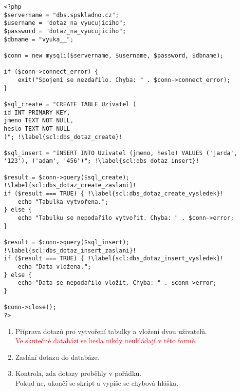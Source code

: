 \begin{minipage}[t]{.45\textwidth}
\begin{code}
\begin{verbatim}
<?php
$servername = "dbs.spskladno.cz"; 
$username = "dotaz_na_vyucujiciho";
$password = "dotaz_na_vyucujiciho";
$dbname = "vyuka__";

$conn = new mysqli($servername, $username, $password, $dbname); 

if ($conn->connect_error) { 
    exit("Spojení se nezdařilo. Chyba: " . $conn->connect_error);
}

$sql_create = "CREATE TABLE Uzivatel ( 
id INT PRIMARY KEY,
jmeno TEXT NOT NULL,
heslo TEXT NOT NULL
)"; !\label{scl:dbs_dotaz_create}!

$sql_insert = "INSERT INTO Uzivatel (jmeno, heslo) VALUES ('jarda', '123'), ('adam', '456')"; !\label{scl:dbs_dotaz_insert}!

$result = $conn->query($sql_create); !\label{scl:dbs_dotaz_create_zaslani}!
if ($result === TRUE) {	!\label{scl:dbs_dotaz_create_vysledek}!
    echo "Tabulka vytvořena.";
} else {
    echo "Tabulku se nepodařilo vytvořit. Chyba: " . $conn->error;
}

$result = $conn->query($sql_insert); !\label{scl:dbs_dotaz_insert_zaslani}!
if ($result === TRUE) {	!\label{scl:dbs_dotaz_insert_vysledek}!
    echo "Data vložena.";
} else {
    echo "Data se nepodařilo vložit. Chyba: " . $conn->error;
}

$conn->close();
?> 
\end{verbatim}

\label{code:php_dbs_create_insert}
\end{code}
\end{minipage}
\begin{minipage}[t]{.45\textwidth}
\begin{enumerate}
\item[ř. \ref{scl:dbs_dotaz_create}, \ref{scl:dbs_dotaz_insert}:] Příprava dotazů pro vytvoření tabulky a vložení dvou uživatelů.\\
\textcolor{red}{Ve skutečné databázi se hesla nikdy neukládají v této  formě.}
\item[ř. \ref{scl:dbs_dotaz_create_zaslani}, \ref{scl:dbs_dotaz_insert_zaslani}:] Zaslání dotazu do databáze.
\vspace{3cm}
\item[ř. \ref{scl:dbs_dotaz_create_vysledek}, \ref{scl:dbs_dotaz_insert_vysledek}:] Kontrola, zda dotazy proběhly v pořádku.\\
Pokud ne, ukončí se skript a vypíše se chybová hláška.
\end{enumerate}
\end{minipage}


